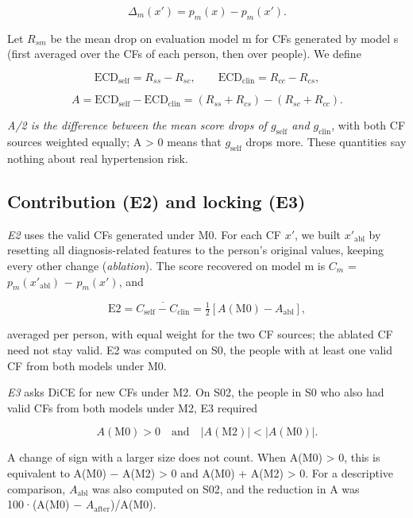 \documentclass[final,5p,times,twocolumn]{elsarticle}
\begin{document}
\[\Delta_m(x') = p_m(x) - p_m(x').\]

Let \(R_{sm}\) be the mean drop on evaluation model m for CFs generated
by model s (first averaged over the CFs of each person, then over
people). We define

\[\mathrm{ECD}_{\mathrm{self}} = R_{ss} - R_{sc}, \qquad \mathrm{ECD}_{\mathrm{clin}} = R_{cc} - R_{cs},\]

\[A = \mathrm{ECD}_{\mathrm{self}} - \mathrm{ECD}_{\mathrm{clin}} = (R_{ss}+R_{cs}) - (R_{sc}+R_{cc}).\]

\emph{A/2 is the difference between the mean score drops of
\(g_{\mathrm{self}}\) and \(g_{\mathrm{clin}}\)}, with both CF sources
weighted equally; A \textgreater{} 0 means that \(g_{\mathrm{self}}\)
drops more. These quantities say nothing about real hypertension risk.

\subsection{Contribution (E2) and locking (E3)}

\emph{E2} uses the valid CFs generated under M0. For each CF \(x'\), we
built \(x'_{\mathrm{abl}}\) by resetting all diagnosis-related features
to the person's original values, keeping every other change
(\emph{ablation}). The score recovered on model m is \(C_m\) =
\(p_m(x'_{\mathrm{abl}})\) − \(p_m(x')\), and

\[\mathrm{E2} = \overline{C_{\mathrm{self}} - C_{\mathrm{clin}}} = \tfrac{1}{2}\left[A(\mathrm{M0}) - A_{\mathrm{abl}}\right],\]

averaged per person, with equal weight for the two CF sources; the
ablated CF need not stay valid. E2 was computed on S0, the people with
at least one valid CF from both models under M0.

\emph{E3} asks DiCE for new CFs under M2. On S02, the people in S0 who
also had valid CFs from both models under M2, E3 required

\[A(\mathrm{M0}) > 0 \quad \text{and} \quad |A(\mathrm{M2})| < |A(\mathrm{M0})|.\]

A change of sign with a larger size does not count. When A(M0)
\textgreater{} 0, this is equivalent to A(M0) − A(M2) \textgreater{} 0
and A(M0) + A(M2) \textgreater{} 0. For a descriptive comparison,
\(A_{\mathrm{abl}}\) was also computed on S02, and the reduction in
\textbar A\textbar{} was 100·(\textbar A(M0)\textbar{} −
\textbar{}\(A_{\mathrm{after}}\)\textbar)/\textbar A(M0)\textbar.
\end{document}
